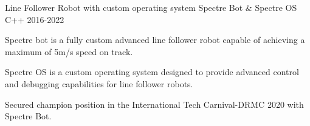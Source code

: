 \begin{cventries}
  \cventryprojects
    {Line Follower Robot with custom operating system} %
    {Spectre Bot \& Spectre OS} %
    {C++} %
    {2016-2022} %
    {
      \begin{cvitems} %
        \item {Spectre bot is a fully custom advanced line 
        follower robot capable of achieving a maximum of 5m/s speed on track.}
\item {Spectre OS is a custom operating system designed to provide advanced control and 
        debugging capabilities for line follower robots.}
\item {Secured champion position in the International Tech Carnival-DRMC 2020 with Spectre Bot.}
      \end{cvitems}
    }

\end{cventries}
